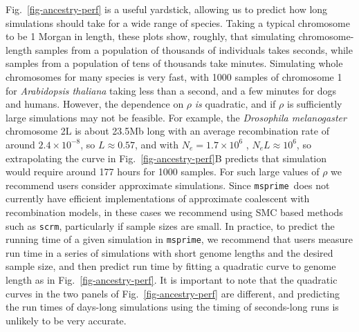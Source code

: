 \documentclass[9pt,twocolumn,twoside,lineno]{gsajnl}
\newcommand{\msprime}[0]{\texttt{msprime}}
\newcommand{\scrm}[0]{\texttt{scrm}}
\begin{document}

Fig.~\ref{fig-ancestry-perf} is a useful yardstick, allowing us
to predict how long simulations should take for a wide range of
species. Taking a typical chromosome to be 1 Morgan in length,
these plots show, roughly, that simulating chromosome-length
samples from a population of thousands of individuals takes seconds,
while samples from a population of tens of thousands take minutes.
Simulating whole chromosomes for many species is very fast,
with 1000 samples of chromosome 1 for
\emph{Arabidopsis thaliana} taking less than a second, and a few
minutes for dogs and humans. However, the dependence on $\rho$
\emph{is} quadratic, and if $\rho$ is sufficiently large simulations
may not be feasible. For example,
the \emph{Drosophila melanogaster} chromosome 2L
is about 23.5Mb long with an average recombination rate of around $2.4 \times 10^{-8}$,
so $L \approx 0.57$,
and with $N_e = 1.7 \times 10^6$ \citep{li2006inferring},
$N_e L \approx 10^6$, so extrapolating the curve in Fig.~\ref{fig-ancestry-perf}B
predicts that simulation would require around 177 hours for 1000 samples.
For such large values of $\rho$  we recommend
users consider approximate simulations. Since \msprime\ does not currently
have efficient implementations of approximate coalescent with recombination
models, in these cases we recommend using SMC based methods such as \scrm,
particularly if sample sizes are small.
In practice, to predict the running time of a given
simulation in \msprime, we recommend that users
measure run time in a series of simulations with short genome lengths and
the desired sample size,
and then predict run time by fitting a quadratic curve to genome length
as in Fig.~\ref{fig-ancestry-perf}.
It is important to note that the quadratic curves in the two
panels of Fig.~\ref{fig-ancestry-perf} are different, and
predicting the run times of days-long simulations
using the timing of seconds-long runs is unlikely to be very accurate.
\end{document}
